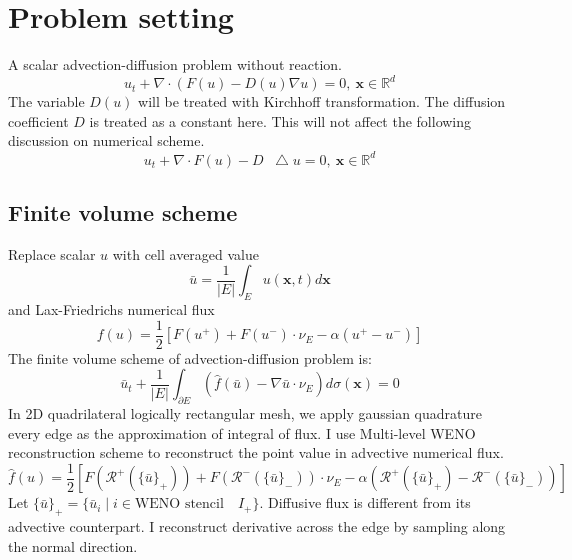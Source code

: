 \documentclass[smallextended]{svjour3}       %
\renewcommand{\div}{\nabla\cdot}
\renewcommand{\Re}{{\mathbb R}}
\newcommand{\bfx}{{\mathbf x}}
\newcommand*\Laplace{\mathop{}\!\mathbin\bigtriangleup}
\begin{document}
\section{Problem setting}
A scalar advection-diffusion problem without reaction.
\begin{equation} \label{eq:ad}
		  u_t + \div (F(u) - D(u) \nabla u) = 0, \ \bfx\in\Re^d
\end{equation}
The variable $D(u)$ will be treated with  Kirchhoff transformation.
The diffusion coefficient $D$ is treated as a constant here.
This will not affect the following discussion on numerical scheme.
\begin{equation} \label{eq:sad}
		  u_t + \div F(u) - D\Laplace u = 0, \ \bfx\in\Re^d
\end{equation}
\subsection{Finite volume scheme}
Replace scalar $u$ with cell averaged value 
\begin{equation}\label{eq:cellaveu}
		  \bar u = \frac{1}{|E|} \int_E u(\bfx, t) d\bfx
\end{equation}
and Lax-Friedrichs numerical flux
\begin{equation}\label{eq:lax}
		  f(u) = \frac{1}{2} [F(u^+)  + F(u^-) \cdot \nu_E - \alpha (u^+ - u^-)]
\end{equation}
The finite volume scheme of advection-diffusion problem is:
\begin{equation}\label{eq:fv}
		  \bar u_t + \frac{1}{|E|} \int_{\partial E} (\hat f(\bar u) - \nabla \bar u \cdot \nu_E) d\sigma(\bfx) = 0
\end{equation}
In 2D quadrilateral logically rectangular mesh, 
we apply gaussian quadrature every edge as the approximation of integral of flux. 
I use Multi-level WENO reconstruction scheme to reconstruct the point value in 
advective numerical flux.
\begin{equation}\label{eq:laxWENO}
		  \hat f(u) = \frac{1}{2} [F(\mathscr{R}^+(\{\bar u\}_+)) + F(\mathscr{R}^-(\{\bar u\}_-))\cdot \nu_E - 
		  \alpha(\mathscr{R}^+(\{\bar u\}_+) - \mathscr{R}^-(\{\bar u\}_-))] 
\end{equation}
Let $\{\bar u\}_+ = \{\bar u_i \mid i \in \text{WENO stencil} \quad I_+ \}$. 
Diffusive flux is different from its advective counterpart.
I reconstruct derivative across the edge by sampling along the normal direction.
\end{document}
